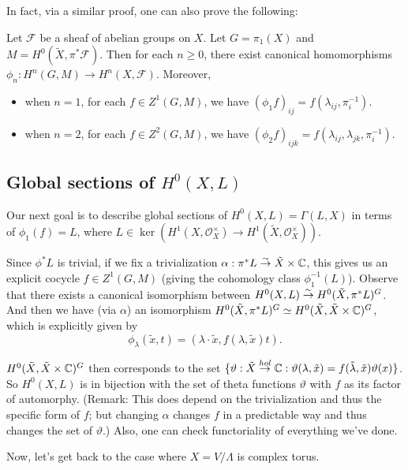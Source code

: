 In fact, via a similar proof, one can also prove the following:

\begin{theorem}
Let $\mathcal{F}$ be a sheaf of abelian groups on $X$. Let $G=\pi_1(X)$ and $M=H^0(\tilde{X},\pi^*\mathcal{F})$. Then for each $n\geq 0$, there exist canonical homomorphisms $\phi_n:H^n(G,M)\to H^n(X,\mathcal{F})$. Moreover, 
\begin{itemize}
\item when $n=1$, for each $f\in Z^1(G,M)$, we have 
$(\phi_1 f)_{ij}=f(\lambda_{ij},\pi_i^{-1})$. 
\item when $n=2$, for each $f\in Z^2(G,M)$, we have 
$(\phi_2 f)_{ijk}=f(\lambda_{ij},\lambda_{jk},\pi_i^{-1})$. 
\end{itemize}

\end{theorem}

\subsection{Global sections of $H^0(X,L)$}

Our next goal is to describe global sections of $H^0(X,L)=\Gamma(L,X)$ in terms of $\phi_1(f)=L$, where $L\in \ker(H^1(X,\mathcal{O}_X^\times)\to H^1(\tilde{X},\mathcal{O}_X^\times))$. 

Since $\phi^*L$ is trivial, if we fix a trivialization $\alpha:\pi^*L\overset{\sim}{\rightarrow} \tilde{X}\times {\mathbb C}$, 
this gives us an explicit cocycle 
$f\in Z^1(G,M)$ (giving the cohomology class $\phi_1^{-1}(L)$). 
Observe that there exists a canonical isomorphism between $H^0(X,L)\overset{\sim}{\rightarrow} H^0(\tilde{X},\pi^*L)^G$. And then we have (via $\alpha$) an isomorphism $H^0(\tilde{X},\pi^*L)^G\simeq H^0(\tilde{X},\tilde{X}\times {\mathbb C})^G$, which is explicitly given by
$$\phi_\lambda(\tilde{x},t)=(\lambda\cdot \tilde{x}, f(\lambda,\tilde{x})t).$$

$H^0(\tilde{X},\tilde{X}\times {\mathbb C})^G$ then corresponds to the set $\{\vartheta:\tilde{X}\overset{hol}{\to}{\mathbb C}: \vartheta(\lambda,\tilde{x})=f(\tilde{\lambda},\tilde{x})\vartheta(x)\}$. So $H^0(X,L)$ is in bijection with the set of theta functions $\vartheta$ with $f$ as its factor of automorphy. 
(Remark: This does depend on the trivialization and thus the specific form of $f$; but changing $\alpha$ changes $f$ in a predictable way and thus changes the set of $\vartheta$.) Also, one can check functoriality of everything we've done.


Now, let's get back to the case where $X=V/\Lambda$ is complex torus. 


